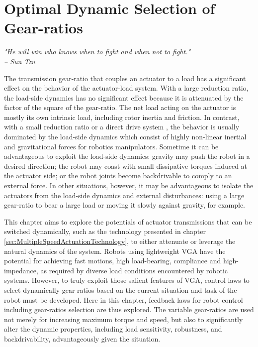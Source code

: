 \chapter{Optimal Dynamic Selection of Gear-ratios}  %
\label{sec:ControlAndPlanningOfRobotUsingVariableGearRatioActuators}


\begin{flushright}
\textit{"He will win who knows when to fight and when not to fight."} \\ \emph{-- Sun Tzu}
\end{flushright}
\vspace{10pt}

The transmission gear-ratio that couples an actuator to a load has a significant effect on the behavior of the actuator-load system. With a large reduction ratio, the load-side dynamics has no significant effect because it is attenuated by the factor of the square of the gear-ratio. The net load acting on the actuator is mostly its own intrinsic load, including rotor inertia and friction. In contrast, with a small reduction ratio or a direct drive system \cite{asada_direct-drive_1987}, the behavior is usually dominated by the load-side dynamics which consist of highly non-linear inertial and gravitational forces for robotics manipulators. Sometime it can be advantageous to exploit the load-side dynamics: gravity may push the robot in a desired direction; the robot may coast with small dissipative torques induced at the actuator side; or the robot joints become backdrivable to comply to an external force. In other situations, however, it may be advantageous to isolate the actuators from the load-side dynamics and external disturbances: using a large gear-ratio to bear a large load or moving it slowly against gravity, for example.

This chapter aims to explore the potentials of actuator transmissions that can be switched dynamically, such as the technology presented in chapter \ref{sec:MultipleSpeedActuationTechnology}, to either attenuate or leverage the natural dynamics of the system. Robots using lightweight VGA have the potential for achieving fast motions, high load-bearing, compliance and high-impedance, as required by diverse load conditions encountered by robotic systems. However, to truly exploit those salient features of VGA, control laws to select dynamically gear-ratios based on the current situation and task of the robot must be developed. Here in this chapter, feedback laws for robot control including gear-ratios selection are thus explored. The variable gear-ratios are used not merely for increasing maximum torque and speed, but also to significantly alter the dynamic properties, including load sensitivity, robustness, and backdrivability, advantageously given the situation.

